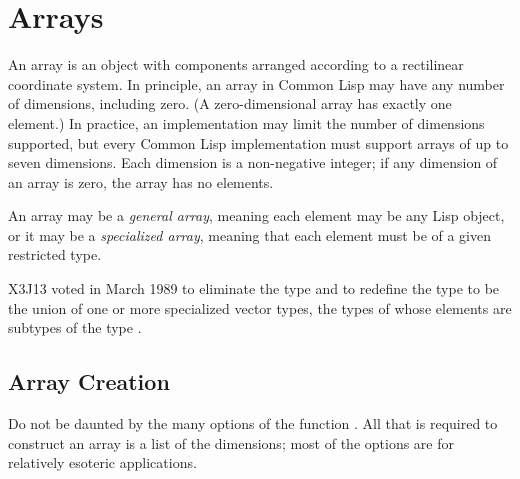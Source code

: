 
\clearpage\def\pagestatus{FINAL PROOF}

\ifx \rulang\Undef

\chapter{Arrays}

An array is an object with components arranged according
to a rectilinear coordinate system.
In principle, an
array in Common Lisp may have any number of dimensions, including zero.
(A zero-dimensional array has exactly one element.)
In practice, an implementation may limit the number of dimensions
supported, but
every Common Lisp implementation must support arrays of up to
seven dimensions.
Each dimension is a non-negative integer; if any dimension of an array is zero,
the array has no elements.

An array may be a \emph{general array}, meaning each element may be any Lisp
object, or it may be a \emph{specialized array}, meaning that each element
must be of a given restricted type.

\begin{newer}
X3J13 voted in March 1989 
to eliminate the type  and to redefine the type
 to be the union of one or more specialized vector
types, the types of whose elements are subtypes of the type .
\end{newer}

\section{Array Creation}

Do not be daunted by the many options of the function .
All that is required to construct an array is a list of
the dimensions; most of the options are for relatively esoteric
applications.

